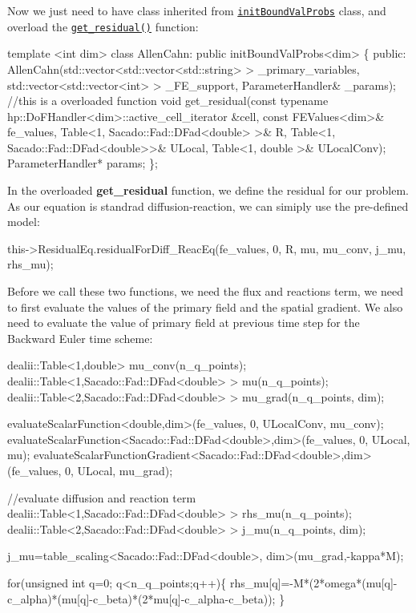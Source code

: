  Now we just need to have class inherited from \href{../html/classinit_bound_val_probs.html}{\tt init\-Bound\-Val\-Probs} class, and overload the \href{../html/classinit_bound_val_probs.html#ac8f2c3e2a1040c70b709900dc3dfdaea}{\tt get\-\_\-residual()} function\-: 
\begin{DoxyCode}
\textcolor{keyword}{template} <\textcolor{keywordtype}{int} dim>
\textcolor{keyword}{class }AllenCahn: \textcolor{keyword}{public} initBoundValProbs<dim>
\{
    \textcolor{keyword}{public}:
        AllenCahn(std::vector<std::vector<std::string> > \_primary\_variables, std::vector<std::vector<int> >
       \_FE\_support, ParameterHandler& \_params);
        \textcolor{comment}{//this is a overloaded function }
        \textcolor{keywordtype}{void} get_residual(\textcolor{keyword}{const} \textcolor{keyword}{typename} hp::DoFHandler<dim>::active\_cell\_iterator &cell, \textcolor{keyword}{const} 
      FEValues<dim>& fe\_values, Table<1, Sacado::Fad::DFad<double> >& R, Table<1, Sacado::Fad::DFad<double>>& ULocal, 
      Table<1, double >& ULocalConv);
        ParameterHandler* params;       
\};
\end{DoxyCode}
 In the overloaded {\bfseries get\-\_\-residual} function, we define the residual for our problem. As our equation is standrad diffusion-\/reaction, we can simiply use the pre-\/defined model\-: 
\begin{DoxyCode}
this->ResidualEq.residualForDiff_ReacEq(fe\_values, 0, R, mu, mu\_conv, j\_mu, rhs\_mu);
\end{DoxyCode}
 Before we call these two functions, we need the flux and reactions term, we need to first evaluate the values of the primary field and the spatial gradient. We also need to evaluate the value of primary field at previous time step for the Backward Euler time scheme\-: 
\begin{DoxyCode}
dealii::Table<1,double>  mu\_conv(n\_q\_points);
dealii::Table<1,Sacado::Fad::DFad<double> >  mu(n\_q\_points);
dealii::Table<2,Sacado::Fad::DFad<double> >  mu\_grad(n\_q\_points, dim);

evaluateScalarFunction<double,dim>(fe\_values, 0, ULocalConv, mu\_conv);
evaluateScalarFunction<Sacado::Fad::DFad<double>,dim>(fe\_values, 0, ULocal, mu);    
evaluateScalarFunctionGradient<Sacado::Fad::DFad<double>,dim>(fe\_values, 0, ULocal, mu\_grad);

\textcolor{comment}{//evaluate diffusion and reaction term}
dealii::Table<1,Sacado::Fad::DFad<double> > rhs\_mu(n\_q\_points);
dealii::Table<2,Sacado::Fad::DFad<double> > j\_mu(n\_q\_points, dim);

j\_mu=table\_scaling<Sacado::Fad::DFad<double>, dim>(mu\_grad,-kappa*M);

\textcolor{keywordflow}{for}(\textcolor{keywordtype}{unsigned} \textcolor{keywordtype}{int} q=0; q<n\_q\_points;q++)\{
     rhs\_mu[q]=-M*(2*omega*(mu[q]-c\_alpha)*(mu[q]-c\_beta)*(2*mu[q]-c\_alpha-c\_beta));
 \}
\end{DoxyCode}
